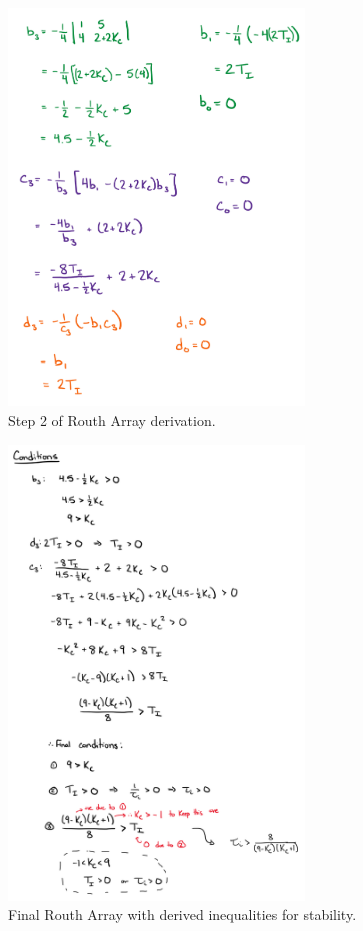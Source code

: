 \documentclass[12pt]{article}
\begin{document}
\begin{enumerate}
\begin{enumerate}
      \begin{figure}[H]
        \centering
        \includegraphics[width=0.7\textwidth]{Figures/figure1-1b.png}
        \caption{Step 2 of Routh Array derivation.}
      \end{figure}
  
      \begin{figure}[H]
        \centering
        \includegraphics[width=0.7\textwidth]{Figures/figure1-1c.png}
        \caption{Final Routh Array with derived inequalities for stability.}
      \end{figure}
  

\end{enumerate}
\end{enumerate}
\end{document}
